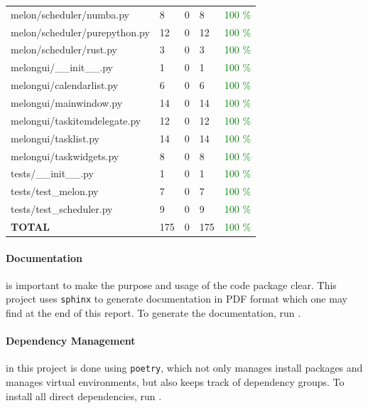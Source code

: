 \documentclass{prettytex/ox/mmsc-special-topic}
\begin{document}
\begin{table}
\begin{tabular}{lllll}
      melon/scheduler/numba.py        & 8         & 0        & 8         & \textcolor{green}{100 \%} \\
      melon/scheduler/purepython.py   & 12        & 0        & 12        & \textcolor{green}{100 \%} \\
      melon/scheduler/rust.py         & 3         & 0        & 3         & \textcolor{green}{100 \%} \\
      melongui/\_\_init\_\_.py        & 1         & 0        & 1         & \textcolor{green}{100 \%} \\
      melongui/calendarlist.py        & 6         & 0        & 6         & \textcolor{green}{100 \%} \\
      melongui/mainwindow.py          & 14        & 0        & 14        & \textcolor{green}{100 \%} \\
      melongui/taskitemdelegate.py    & 12        & 0        & 12        & \textcolor{green}{100 \%} \\
      melongui/tasklist.py            & 14        & 0        & 14        & \textcolor{green}{100 \%} \\
      melongui/taskwidgets.py         & 8         & 0        & 8         & \textcolor{green}{100 \%} \\
      tests/\_\_init\_\_.py           & 1         & 0        & 1         & \textcolor{green}{100 \%} \\
      tests/test\_melon.py            & 7         & 0        & 7         & \textcolor{green}{100 \%} \\
      tests/test\_scheduler.py        & 9         & 0        & 9         & \textcolor{green}{100 \%} \\
      \hline
      \bf TOTAL                       & 175       & 0        & 175       & \textcolor{green}{100 \%} \\
      \hline
    \end{tabular}
    \label{table:interrogate}
  \end{table}

  \paragraph{Documentation} is important to make the purpose and usage of the code package clear. This project uses \texttt{sphinx} to generate documentation in PDF format which one may find at the end of this report. To generate the documentation, run .

  \paragraph{Dependency Management} in this project is done using \texttt{poetry}, which not only manages install packages and manages virtual environments, but also keeps track of dependency groups.
  To install all direct dependencies, run .
\end{document}
